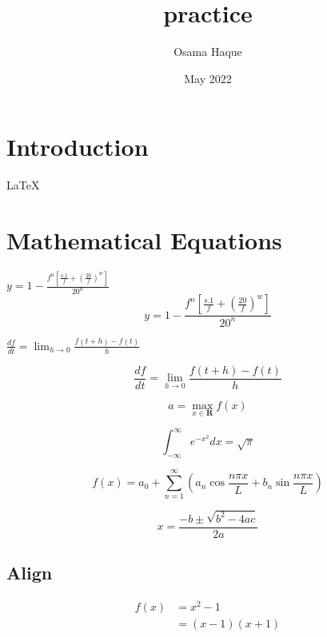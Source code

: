 \documentclass{article}
\title{practice}
\author{Osama Haque}
\date{May 2022}
\begin{document}
\maketitle

\tableofcontents %
\pagebreak %

\section{Introduction}
\LaTeX

\section{Mathematical Equations}
$
{y} = 1 - \frac{f^n[\frac{s.1}{f} + {(\frac{20}{f})}^w ]}{20^n}
$
\begin{equation}
    {y} = 1 - \frac{f^n[\frac{s.1}{f} + {(\frac{20}{f})}^w ]}{20^n}
\end{equation}

$
\frac{df}{dt} = \lim_{h\to 0} \frac{f(t+h)-f(t) }{h}
$

\begin{equation}
    \frac{df}{dt} = \lim_{h\to 0} \frac{f(t+h)-f(t) }{h}
\end{equation}

\begin{equation}
    a = \max_{x \in \mathbf{R}}f(x) 
\end{equation}

\begin{equation}
   \int_{-\infty}^{\infty} e^{-x^2} dx = \sqrt{\pi}
\end{equation}

\begin{equation}
    f(x) = a_0 + \sum_{n=1}^\infty(a_n\cos{\frac{n \pi x}{L}} + b_n\sin{\frac{n \pi x}{L}})
\end{equation}

\begin{equation}
    x = \frac{-b \pm \sqrt{b^2 - 4ac}}{2a}   %
\end{equation}

\subsection{Align}
\begin{align}
    f(x) &= x^2-1 \nonumber \\
     &= (x-1)(x+1)
\end{align}
\end{document}

